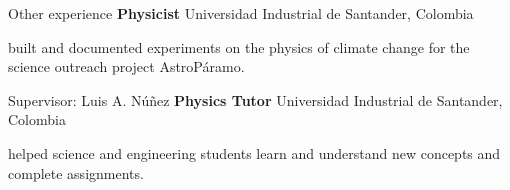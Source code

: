 \begin{rubric}{Other experience}
\textbf{Physicist} \newline
Universidad Industrial de Santander, Colombia
\begin{description}[style=sameline,parsep=0pt,topsep=0pt,leftmargin=1.3cm]
  \item[Duties:]built and documented experiments on the physics of climate change for the science outreach project AstroPáramo.
\end{description}
Supervisor: Luis A. Núñez
%
\textbf{Physics Tutor} \newline 
Universidad Industrial de Santander, Colombia
\begin{description}[style=sameline,parsep=0pt,topsep=0pt,leftmargin=1.3cm]
  \item[Duties:]helped science and engineering students learn and understand new concepts and complete assignments.
\end{description}
%
%
%
%
\end{rubric}